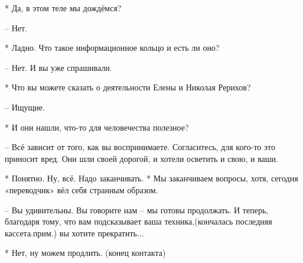  * Да, в этом теле мы дождёмся?

 – Нет.

 * Ладно. Что такое информационное кольцо и есть ли оно?

 – Нет. И вы уже спрашивали.

 * Что вы можете сказать о деятельности Елены и Николая Рерихов?

 – Ищущие.

 * И они нашли, что-то для человечества полезное?

 – Всё зависит от того, как вы воспринимаете. Согласитесь, для кого-то это приносит вред. Они шли своей дорогой, и хотели осветить и свою, и ваши.

 * Понятно. Ну, всё. Надо заканчивать.
 * Мы заканчиваем вопросы, хотя, сегодня «переводчик» вёл себя странным образом.

 – Вы удивительны. Вы говорите нам – мы готовы продолжать. И теперь, благодаря тому, что вам подсказывает ваша техника,(кончалась последняя кассета.прим.) вы хотите прекратить...

 * Нет, ну можем продлить. 
 (конец контакта) 
